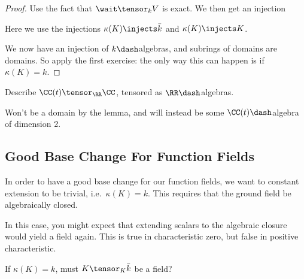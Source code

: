 \begin{proof}

Use the fact that \(\wait \tensor_k V\) is exact. We then get an
injection

\begin{center}\end{center}

Here we use the injections \(\kappa(K) \injects \bar k\) and
\(\kappa(K) \injects K\).

We now have an injection of \(k\dash\)algebras, and subrings of domains
are domains. So apply the first exercise: the only way this can happen
is if \(\kappa(K) = k\).

\end{proof}

\begin{exercise}

Describe \(\CC(t) \tensor_\RR \CC\), tensored as \(\RR\dash\)algebras.

\end{exercise}

\begin{remark}

Won't be a domain by the lemma, and will instead be some
\(\CC(t)\dash\)algebra of dimension 2.

\end{remark}

\hypertarget{good-base-change-for-function-fields}{%
\subsection{Good Base Change For Function
Fields}\label{good-base-change-for-function-fields}}

In order to have a good base change for our function fields, we want to
constant extension to be trivial, i.e.~\(\kappa(K) = k\). This requires
that the ground field be algebraically closed.

In this case, you might expect that extending scalars to the algebraic
closure would yield a field again. This is true in characteristic zero,
but false in positive characteristic.

\begin{question}

If \(\kappa(K) = k\), must \(K\tensor_K \bar k\) be a field?

\end{question}

